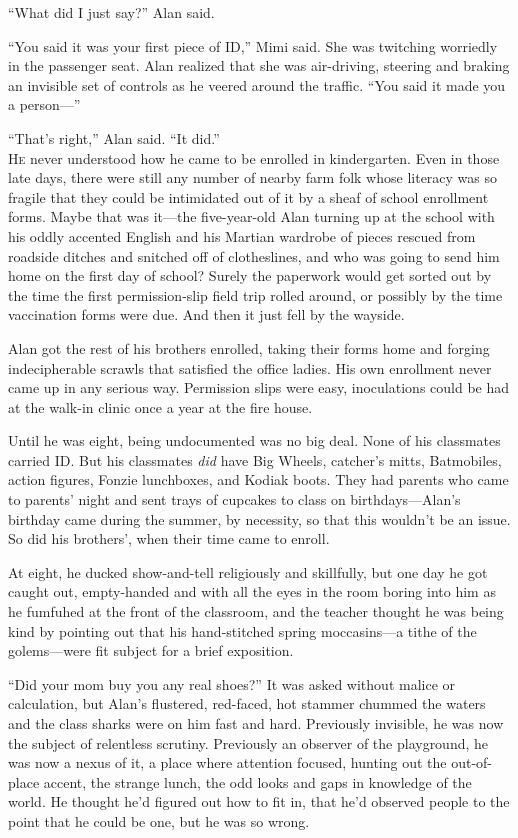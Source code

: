 \documentclass{article}
\begin{document}
``What did I just say?'' Alan said.

``You said it was your first piece of ID,'' Mimi said.  She was
twitching worriedly in the passenger seat.  Alan realized that she was
air-driving, steering and braking an invisible set of controls as he
veered around the traffic.  ``You said it made you a person---''

``That's right,'' Alan said.  ``It did.''
\\
\lettrine[lines=3, lhang=.5, nindent=0pt, findent=2pt]{H}{e} never understood how he came to be enrolled in kindergarten.  Even
in those late days, there were still any number of nearby farm folk
whose literacy was so fragile that they could be intimidated out of it
by a sheaf of school enrollment forms.  Maybe that was it---the
five-year-old Alan turning up at the school with his oddly accented
English and his Martian wardrobe of pieces rescued from roadside
ditches and snitched off of clotheslines, and who was going to send
him home on the first day of school?  Surely the paperwork would get
sorted out by the time the first permission-slip field trip rolled
around, or possibly by the time vaccination forms were due.  And then
it just fell by the wayside.

Alan got the rest of his brothers enrolled, taking their forms home
and forging indecipherable scrawls that satisfied the office ladies. 
His own enrollment never came up in any serious way.  Permission slips
were easy, inoculations could be had at the walk-in clinic once a year
at the fire house.

Until he was eight, being undocumented was no big deal.  None of his
classmates carried ID.  But his classmates \textit{did} have Big
Wheels, catcher's mitts, Batmobiles, action figures, Fonzie
lunchboxes, and Kodiak boots.  They had parents who came to parents'
night and sent trays of cupcakes to class on birthdays---Alan's
birthday came during the summer, by necessity, so that this wouldn't
be an issue.  So did his brothers', when their time came to enroll.

At eight, he ducked show-and-tell religiously and skillfully, but one
day he got caught out, empty-handed and with all the eyes in the room
boring into him as he fumfuhed at the front of the classroom, and the
teacher thought he was being kind by pointing out that his
hand-stitched spring moccasins---a tithe of the golems---were fit
subject for a brief exposition.

``Did your mom buy you any real shoes?'' It was asked without malice
or calculation, but Alan's flustered, red-faced, hot stammer chummed
the waters and the class sharks were on him fast and hard.  Previously
invisible, he was now the subject of relentless scrutiny.  Previously
an observer of the playground, he was now a nexus of it, a place where
attention focused, hunting out the out-of-place accent, the strange
lunch, the odd looks and gaps in knowledge of the world.  He thought
he'd figured out how to fit in, that he'd observed people to the point
that he could be one, but he was so wrong.
\end{document}
